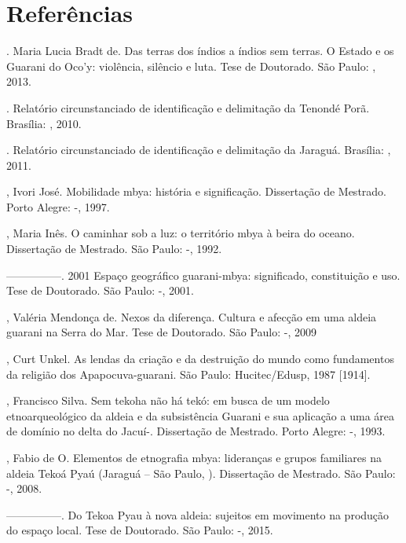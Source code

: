 \section{Referências} 

\begin{Parskip}
. Maria Lucia Bradt de. Das terras dos índios a índios sem
terras. O Estado e os Guarani do Oco’y: violência, silêncio e luta.
Tese de Doutorado. São Paulo: , 2013.

. Relatório circunstanciado de identificação e delimitação da 
Tenondé Porã. Brasília: , 2010.

. Relatório circunstanciado de identificação e delimitação da 
Jaraguá. Brasília: , 2011.

, Ivori José. Mobilidade mbya: história e significação.
Dissertação de Mestrado. Porto Alegre: -, 1997.

, Maria Inês. O caminhar sob a luz: o território mbya à beira do
oceano. Dissertação de Mestrado. São Paulo: -, 1992. 

—————. 2001 Espaço geográfico guarani-mbya: significado, constituição e
uso. Tese de Doutorado. São Paulo: -, 2001.

, Valéria Mendonça de. Nexos da diferença. Cultura e afecção em
uma aldeia guarani na Serra do Mar. Tese de Doutorado. São Paulo:
-, 2009

, Curt Unkel. As lendas da criação e da destruição do mundo
como fundamentos da religião dos Apapocuva-guarani. São Paulo:
Hucitec/Edusp, 1987 [1914].

, Francisco Silva. Sem tekoha não há tekó: em busca de um modelo
etnoarqueológico da aldeia e da subsistência Guarani e sua aplicação a
uma área de domínio no delta do Jacuí-. Dissertação de Mestrado.
Porto Alegre: -, 1993.

  , Fabio de O. Elementos de etnografia mbya: lideranças
e grupos familiares na aldeia Tekoá Pyaú (Jaraguá – São Paulo, ).
Dissertação de Mestrado. São Paulo: -, 2008.

—————. Do Tekoa Pyau à nova aldeia: sujeitos em movimento na produção do
espaço local. Tese de Doutorado. São Paulo: -, 2015.


\end{Parskip}

